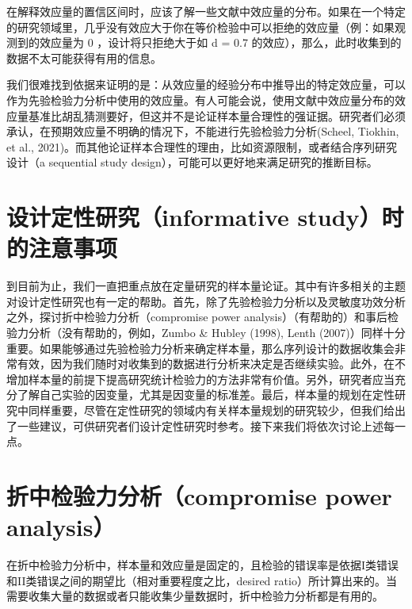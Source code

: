 \documentclass[
  letterpaper,
  DIV=11,
  numbers=noendperiod]{scrreprt}
\begin{document}
在解释效应量的置信区间时，应该了解一些文献中效应量的分布。如果在一个特定的研究领域里，几乎没有效应大于你在等价检验中可以拒绝的效应量（例：如果观测到的效应量为
0 ，设计将只拒绝大于如 d = 0.7
的效应），那么，此时收集到的数据不太可能获得有用的信息。

我们很难找到依据来证明的是：从效应量的经验分布中推导出的特定效应量，可以作为先验检验力分析中使用的效应量。有人可能会说，使用文献中效应量分布的效应量基准比胡乱猜测要好，但这并不是论证样本量合理性的强证据。研究者们必须承认，在预期效应量不明确的情况下，不能进行先验检验力分析(Scheel,
Tiokhin, et al.,
2021)。而其他论证样本合理性的理由，比如资源限制，或者结合序列研究设计（a
sequential study design），可能可以更好地来满足研究的推断目标。

\hypertarget{ux8bbeux8ba1ux5b9aux6027ux7814ux7a76informative-studyux65f6ux7684ux6ce8ux610fux4e8bux9879}{%
\section{设计定性研究（informative
study）时的注意事项}\label{ux8bbeux8ba1ux5b9aux6027ux7814ux7a76informative-studyux65f6ux7684ux6ce8ux610fux4e8bux9879}}

到目前为止，我们一直把重点放在定量研究的样本量论证。其中有许多相关的主题对设计定性研究也有一定的帮助。首先，除了先验检验力分析以及灵敏度功效分析之外，探讨折中检验力分析（compromise
power analysis）（有帮助的）和事后检验力分析（没有帮助的，例如，Zumbo \&
Hubley (1998), Lenth
(2007)）同样十分重要。如果能够通过先验检验力分析来确定样本量，那么序列设计的数据收集会非常有效，因为我们随时对收集到的数据进行分析来决定是否继续实验。此外，在不增加样本量的前提下提高研究统计检验力的方法非常有价值。另外，研究者应当充分了解自己实验的因变量，尤其是因变量的标准差。最后，样本量的规划在定性研究中同样重要，尽管在定性研究的领域内有关样本量规划的研究较少，但我们给出了一些建议，可供研究者们设计定性研究时参考。接下来我们将依次讨论上述每一点。

\hypertarget{ux6298ux4e2dux68c0ux9a8cux529bux5206ux6790compromise-power-analysis}{%
\section{折中检验力分析（compromise power
analysis）}\label{ux6298ux4e2dux68c0ux9a8cux529bux5206ux6790compromise-power-analysis}}

在折中检验力分析中，样本量和效应量是固定的，且检验的错误率是依据I类错误和II类错误之间的期望比（相对重要程度之比，desired
ratio）所计算出来的。当需要收集大量的数据或者只能收集少量数据时，折中检验力分析都是有用的。
\end{document}
